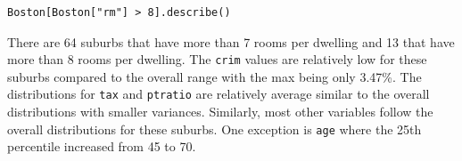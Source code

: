 \documentclass{article}
\begin{document}
\begin{probset}
\begin{prob}
\begin{subprobset}
\begin{subprob}
\begin{verbatim}
Boston[Boston["rm"] > 8].describe()
            \end{verbatim}

            \begin{soln}
                There are 64 suburbs that have more than 7 rooms per dwelling and 13 that have more than 8 rooms per dwelling. The \texttt{crim} values are relatively low for these suburbs compared to the overall range with the max being only 3.47\%. The distributions for \texttt{tax} and \texttt{ptratio} are relatively average similar to the overall distributions with smaller variances. Similarly, most other variables follow the overall distributions for these suburbs. One exception is \texttt{age} where the 25th percentile increased from 45 to 70.
            \end{soln}
        \end{subprob}
    \end{subprobset}
\end{prob}
\end{probset}
\end{document}
